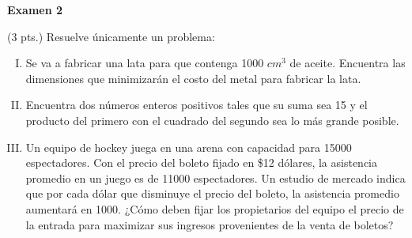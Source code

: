 \documentclass[12pt]{exam}
\begin{document}
\centering


\Large 
\textbf{Examen 2}\\


\normalsize

\pointformat{\bfseries\boldmath(\thepoints)}
\vskip15pt

    
    \begin{questions}

     \question (3 pts.) Resuelve únicamente un problema:
 \begin{enumerate}[I)]
    
   \item Se va a fabricar una lata para que contenga 1000 $cm^3$ de aceite. Encuentra las dimensiones que minimizarán el costo del metal para fabricar la lata. 

   \item Encuentra dos números enteros positivos tales que su suma sea 15 y el producto del primero con el cuadrado del segundo sea lo más grande posible.

   \item Un equipo de hockey juega en una arena con capacidad para 15000 espectadores. Con el precio del boleto fijado en \$12 dólares, la asistencia promedio en un juego es de 11000 espectadores. Un estudio de mercado indica que por cada dólar que disminuye el precio del boleto, la asistencia promedio aumentará en 1000. ¿Cómo deben fijar los propietarios del equipo el precio de la entrada para maximizar sus ingresos provenientes de la venta de boletos?
\end{enumerate}

\vskip10pt
     

\end{questions}
\end{document}
